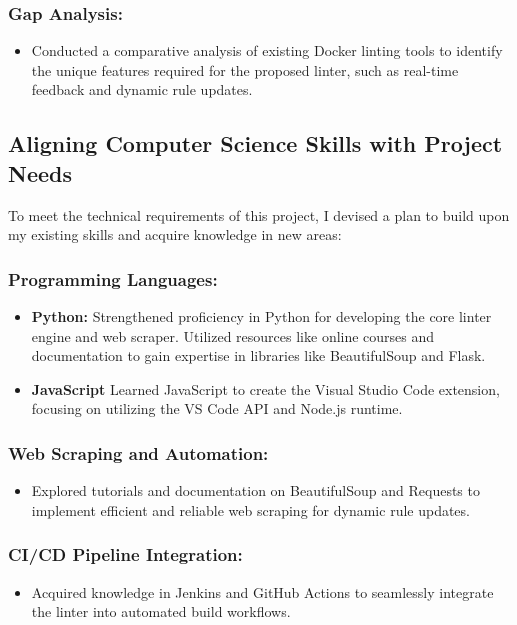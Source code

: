 \subsubsection{Gap Analysis:}
\begin{itemize}
    \item Conducted a comparative analysis of existing Docker linting tools to identify the unique features required for the proposed linter, such as real-time feedback and dynamic rule updates.
\end{itemize}

\subsection{Aligning Computer Science Skills with Project Needs}
To meet the technical requirements of this project, I devised a plan to build upon my existing skills and acquire knowledge in new areas:

\subsubsection{Programming Languages:}
\begin{itemize}
    \item \textbf{Python:} Strengthened proficiency in Python for developing the core linter engine and web scraper. Utilized resources like online courses and documentation to gain expertise in libraries like BeautifulSoup and Flask.
    \item \textbf{JavaScript} Learned JavaScript to create the Visual Studio Code extension, focusing on utilizing the VS Code API and Node.js runtime.
\end{itemize}

\subsubsection{Web Scraping and Automation:}
\begin{itemize}
    \item Explored tutorials and documentation on BeautifulSoup and Requests to implement efficient and reliable web scraping for dynamic rule updates.
\end{itemize}

\subsubsection{CI/CD Pipeline Integration:}
\begin{itemize}
    \item Acquired knowledge in Jenkins and GitHub Actions to seamlessly integrate the linter into automated build workflows.
\end{itemize}

